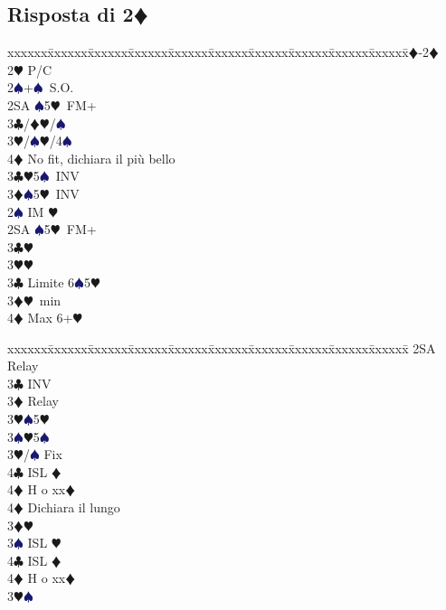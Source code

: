 \documentclass[a4paper,italian]{article}
\newcommand{\BC}{\textcolor{OliveGreen}{$\clubsuit$}}
\newcommand{\BD}{\textcolor{RedOrange}{$\vardiamondsuit$}}
\newcommand{\BH}{\textcolor{Red2}{$\varheartsuit${}}}
\newcommand{\BS}{\textcolor{MidnightBlue}{$\spadesuit${}}}
\newcommand{\pdfd}{\texorpdfstring{\BD{}}{D}}
\newenvironment{bidtable}
{\begin{tabbing}

    xxxxxx\=xxxxxx\=xxxxxx\=xxxxxx\=xxxxxx\=xxxxxx\=xxxxxx\=xxxxxx\=xxxxxx\=xxxxxx\=\kill}
{\end{tabbing} }%
\begin{document}
\subsection{Risposta di 2\pdfd}

\begin{multicols}{2}

    \begin{bidtable}
        1\BD-2\BD\+\\
        2\BH \> P/C\+\\
        2\BS {}+\BS\ S.O.\\
        2SA \BS 5\BH\ FM+\+\\
        3\BC/\BD {}\BH /\BS \\
        3\BH/\BS {}\BH /4\BS \\
        4\BD \> No fit, dichiara il più bello\-\\
        3\BC {}\BH 5\BS\ INV\\
        3\BD {}\BS 5\BH\ INV\-\\
        2\BS \> IM \BH \+\\
        2SA \BS 5\BH\ FM+\+\\
        3\BC {}\BH \\
        3\BH {}\BH \-\\
        3\BC \> Limite 6\BS 5\BH \\
        3\BD {}\BH\ min\\
        4\BD \> Max 6+\BH \-\\
    \end{bidtable}
    \columnbreak
    \begin{bidtable}
        2SA \> Relay\+\\
        3\BC {} INV\+\\
        3\BD \> Relay\+\\
        3\BH {}\BS 5\BH \\
        3\BS {}\BH 5\BS \-\\
        3\BH/\BS \> Fix\\
        4\BC \> ISL \BD \+\\
        4\BD \> H o xx\BD \-\\
        4\BD \> Dichiara il lungo\-\\
        3\BD {}\BH \+\\
        3\BS \> ISL \BH \\
        4\BC \> ISL \BD \+\\
        4\BD \> H o xx\BD \-\-\\
        3\BH {}\BS \+\\

\end{bidtable}
\end{multicols}
\end{document}
